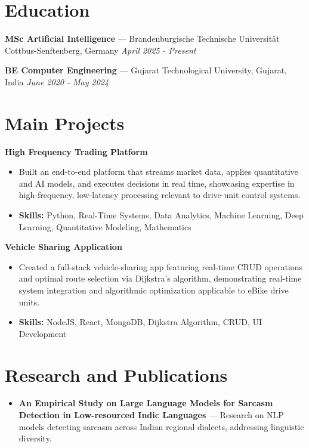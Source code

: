 \documentclass[a4paper,10pt]{article}
\begin{document}
\section*{Education}
\textbf{MSc Artificial Intelligence} — Brandenburgische Technische Universität Cottbus-Senftenberg, Germany \hfill \textit{April 2025 - Present}\par
\vspace{1.5pt}
\textbf{BE Computer Engineering} — Gujarat Technological University, Gujarat, India \hfill \textit{June 2020 - May 2024}\par

\section*{Main Projects}
\textbf{High Frequency Trading Platform}\par
\vspace{1pt}
\begin{itemize}
  \item Built an end-to-end platform that streams market data, applies quantitative and AI models, and executes decisions in real time, showcasing expertise in high-frequency, low-latency processing relevant to drive-unit control systems.
  \item \textbf{Skills:} Python, Real-Time Systems, Data Analytics, Machine Learning, Deep Learning, Quantitative Modeling, Mathematics
\end{itemize}
\vspace{3pt}
\textbf{Vehicle Sharing Application}\par
\vspace{1pt}
\begin{itemize}
  \item Created a full-stack vehicle-sharing app featuring real-time CRUD operations and optimal route selection via Dijkstra's algorithm, demonstrating real-time system integration and algorithmic optimization applicable to eBike drive units.
  \item \textbf{Skills:} NodeJS, React, MongoDB, Dijkstra Algorithm, CRUD, UI Development
\end{itemize}

\section*{Research and Publications}
\begin{itemize}
\item \textbf{An Empirical Study on Large Language Models for Sarcasm Detection in Low-resourced Indic Languages} — Research on NLP models detecting sarcasm across Indian regional dialects, addressing linguistic diversity.
\end{itemize}
\end{document}
